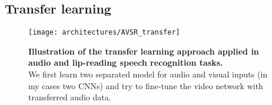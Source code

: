 \subsection{Transfer learning}

\begin{figure}[H]
  \centering
  \texttt{[image: architectures/AVSR\_transfer]}\\[-1em]
  \caption{%
    \textbf{Illustration of the transfer learning approach applied in
      audio and lip-reading speech recognition tasks.}\\[0.1em]
    We first learn two separated model for audio and visual inputs
      (in my cases two CNNs) and try to fine-tune the video network
      with transferred audio data.
    }
  \label{fig:AVSR_transfer}
\end{figure}
